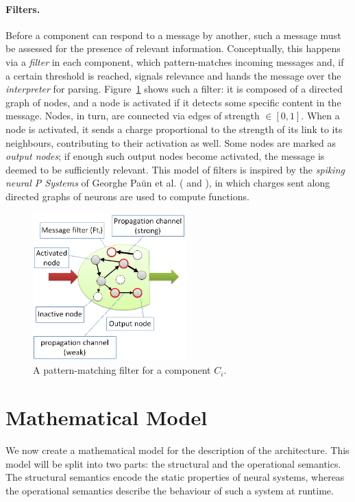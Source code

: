 \paragraph{Filters.} Before a component can respond to a message by another, such a message must be assessed for the presence of relevant information. Conceptually, this happens via a \emph{filter} in each component, which pattern-matches incoming messages and, if a certain threshold is reached, signals relevance and hands the message over the \emph{interpreter} for parsing. Figure~\ref{fig:filter} shows such a filter: it is composed of a directed graph of nodes, and a node is activated if it detects some specific content in the message. Nodes, in turn, are connected via edges of strength $\in [0,1]$. When a node is activated, it sends a charge proportional to the strength of its link to its neighbours, contributing to their activation as well. Some nodes are marked as {\em output nodes}; if enough such output nodes become activated, the message is deemed to be sufficiently relevant. This model of filters is inspired by the {\em spiking neural P Systems} of Georghe Pa\u{u}n et al. (\cite[p.\ 337]{membraneComputing} and \cite{spikingNeural}), in which charges sent along directed graphs of neurons are used to compute functions.

\begin{figure}[!h]
	\centering
	\includegraphics[width=168pt]{Figs/filter.png}
	\caption{A pattern-matching filter for a component $C_i$.}
	\label{fig:filter}
\end{figure}

\section{Mathematical Model}\label{sec:mathematicalModel}

We now create a mathematical model for the description of the architecture. This model will be split into two parts: the structural and the operational semantics. The structural semantics encode the static properties of neural systems, whereas the operational semantics describe the behaviour of such a system at runtime.

